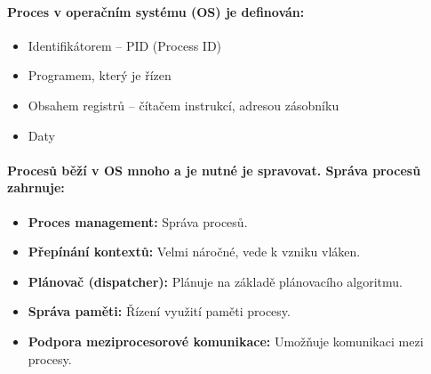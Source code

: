 \paragraph{Proces v operačním systému (OS) je definován:}
\begin{itemize}
    \item Identifikátorem – PID (Process ID)
    \item Programem, který je řízen
    \item Obsahem registrů – čítačem instrukcí, adresou zásobníku
    \item Daty
\end{itemize}

\paragraph{Procesů běží v OS mnoho a je nutné je spravovat. Správa procesů zahrnuje:}
\begin{itemize}
    \item \textbf{Proces management:} Správa procesů.
    \item \textbf{Přepínání kontextů:} Velmi náročné, vede k vzniku vláken.
    \item \textbf{Plánovač (dispatcher):} Plánuje na základě plánovacího algoritmu.
    \item \textbf{Správa paměti:} Řízení využití paměti procesy.
    \item \textbf{Podpora meziprocesorové komunikace:} Umožňuje komunikaci mezi procesy.
\end{itemize}

